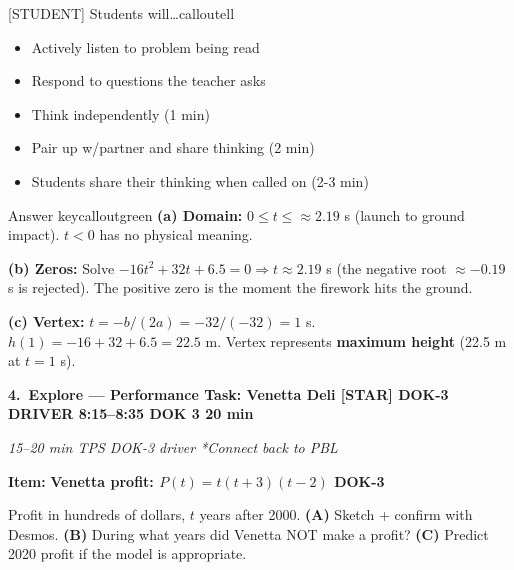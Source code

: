 \documentclass[10pt]{article}
\newcommand{\phasehead}[6]{%
  \vspace{0.25em}
  \noindent\colorbox{tealheader}{\parbox{\dimexpr\linewidth-2\fboxsep}{%
    \color{white}\bfseries #1.\ #2 \hfill \normalfont\bfseries #3 \textbullet{} DOK #4 \textbullet{} #5 min%
  }}\par
  {\small\itshape\color{framegray}#6}\par
  \smallskip
}
\newcommand{\itembox}[2]{%
  \begin{tcolorbox}[
    enhanced, breakable, colback=frameshade, colframe=dayblue,
    boxrule=0.6pt, arc=2pt, left=7pt, right=7pt, top=4pt, bottom=4pt
  ]
  \textbf{Item:} \textbf{#1}\par#2
  \end{tcolorbox}
}
\begin{document}
\begin{callout}{[STUDENT] Students will\ldots}{calloutell}
\begin{itemize}[leftmargin=1.4em,itemsep=1pt,topsep=1pt]
  \item Actively listen to problem being read
  \item Respond to questions the teacher asks
  \item Think independently (1 min)
  \item Pair up w/partner and share thinking (2 min)
  \item Students share their thinking when called on (2-3 min)
\end{itemize}
\end{callout}

\begin{callout}{\IconStar{} Answer key}{calloutgreen}
\textbf{(a) Domain:} $0 \le t \le \approx 2.19$ s (launch to ground impact). $t < 0$ has no physical meaning.\par
\textbf{(b) Zeros:} Solve $-16t^2 + 32t + 6.5 = 0 \Rightarrow t \approx 2.19$ s (the negative root $\approx -0.19$ s is rejected). The positive zero is the moment the firework hits the ground.\par
\textbf{(c) Vertex:} $t = -b/(2a) = -32/(-32) = 1$ s. $h(1) = -16 + 32 + 6.5 = 22.5$ m. Vertex represents \textbf{maximum height} (22.5 m at $t = 1$ s).
\end{callout}

\phasehead{4}{Explore --- Performance Task: Venetta Deli {[STAR] DOK-3 DRIVER}}{8:15--8:35}{3}{20}{15--20 min \textbullet{} TPS \textbullet{} DOK-3 driver \textbullet{} *Connect back to PBL}

\itembox{Venetta profit: $P(t) = t(t+3)(t-2)$ \quad {\IconStar} DOK-3}{Profit in hundreds of dollars, $t$ years after 2000. \textbf{(A)} Sketch + confirm with Desmos. \textbf{(B)} During what years did Venetta NOT make a profit? \textbf{(C)} Predict 2020 profit if the model is appropriate.}
\end{document}
